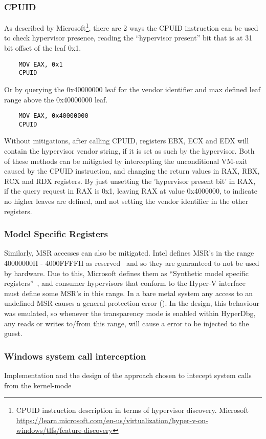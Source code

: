\subsubsection{CPUID}
As described by Microsoft\footnote{CPUID instruction description in terms of hypervisor discovery. Microsoft \url{https://learn.microsoft.com/en-us/virtualization/hyper-v-on-windows/tlfs/feature-discovery}}, 
there are 2 ways the CPUID instruction can be used to check hypervisor presence, reading the “hypervisor present” bit that is at 31 bit offset of the leaf 0x1.
\begin{verbatim}
    MOV EAX, 0x1
    CPUID
\end{verbatim}
Or by querying the 0x40000000 leaf for the vendor identifier and max defined leaf range above the 0x40000000 leaf. 
\begin{verbatim}
    MOV EAX, 0x40000000
    CPUID
\end{verbatim}
Without mitigations, after calling CPUID, registers EBX, ECX and EDX will contain the hypervisor vendor string, if it is set as such by the hypervisor.
Both of these methods can be mitigated by intercepting the unconditional VM-exit caused by the CPUID instruction, and changing the return values in RAX, RBX, RCX and RDX registers. 
By just unsetting the 'hypervisor present bit' in RAX, if the query request in RAX is 0x1, leaving RAX at value 0x4000000, to indicate no higher leaves are defined, and not setting the vendor identifier in the other registers.

\subsubsection{Model Specific Registers}
Similarly, MSR accesses can also be mitigated. Intel defines MSR's in the range 40000000H - 4000FFFFH as reserved~\cite[Volume 4]{Intel-SDM2025} and so they are guaranteed to not be used by hardware. 
Due to this, Microsoft defines them as “Synthetic model specific registers”~\cite{microsoft_hv_interface_reqs}, and consumer hypervisors that conform to the Hyper-V  interface must define some MSR's in this range. 
In a bare metal system any access to an undefined MSR causes a general protection error (). In the design, this behaviour was emulated, 
so whenever the transparency mode is enabled within HyperDbg, any reads or writes to/from this range, will cause a  error to be injected to the guest.

\subsubsection{Windows system call interception}\label{syscall_interception}
Implementation and the design of the approach chosen to intecept system calls from the kernel-mode
